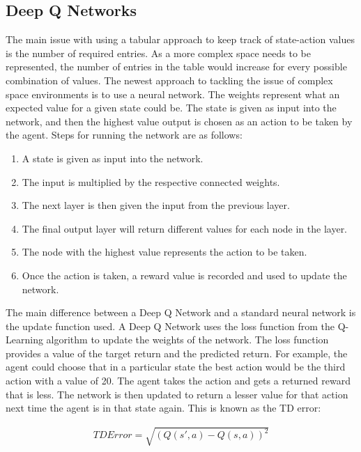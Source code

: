 \subsection{Deep Q Networks}

The main issue with using a tabular approach to keep track of state-action
values is the number of required entries. As a more complex space needs to be
represented, the number of entries in the table would increase for every
possible combination of values. The newest approach to tackling the issue of
complex space environments is to use a neural network. The weights represent
what an expected value for a given state could be. The state is given as input
into the network, and then the highest value output is chosen as an action to be
taken by the agent. Steps for running the network are as follows:

\begin{enumerate}
    \item A state is given as input into the network.
    \item The input is multiplied by the respective connected weights.
    \item The next layer is then given the input from the previous layer.
    \item The final output layer will return different values for each node in
        the layer.
    \item The node with the highest value represents the action to be taken.
    \item Once the action is taken, a reward value is recorded and used to
        update the network.
\end{enumerate}

The main difference between a Deep Q Network and a standard neural network is
the update function used. A Deep Q Network uses the loss function from the
Q-Learning algorithm to update the weights of the network. The loss function
provides a value of the target return and the predicted return. For example, the
agent could choose that in a particular state the best action would be the third
action with a value of 20. The agent takes the action and gets a returned reward
that is less. The network is then updated to return a lesser value for that
action next time the agent is in that state again. This is known as the TD
error:

\begin{align}
    TD Error = \sqrt{{(Q(s',a) - Q(s,a))}^{2}}
\end{align}

